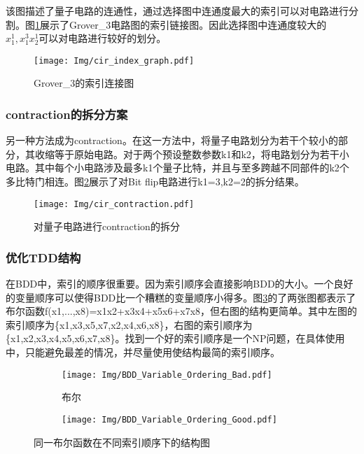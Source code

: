 该图描述了量子电路的连通性，通过选择图中连通度最大的索引可以对电路进行分割。图\ref{fig:addition}展示了Grover\_3电路图的索引链接图。因此选择图中连通度较大的$x_1^1,x_1^3x_2^1$可以对电路进行较好的划分。
 
\begin{figure}[!htbp]
	\centering
	\texttt{[image: Img/cir\_index\_graph.pdf]}
	\caption{Grover\_3的索引连接图}
	\label{fig:addition}
\end{figure} 
\subsubsection{contraction的拆分方案}
另一种方法成为contraction。在这一方法中，将量子电路划分为若干个较小的部分，其收缩等于原始电路。对于两个预设整数参数k1和k2，将电路划分为若干小电路。其中每个小电路涉及最多k1个量子比特，并且与至多跨越不同部件的k2个多比特门相连。图\ref{fig:contraction}展示了对Bit flip电路进行k1=3,k2=2的拆分结果。
\begin{figure}[!htbp]
	\centering
	\texttt{[image: Img/cir\_contraction.pdf]}
	\caption{对量子电路进行contraction的拆分}
	\label{fig:contraction}
\end{figure} 
\subsubsection{优化TDD结构}

在BDD中，索引的顺序很重要。因为索引顺序会直接影响BDD的大小。一个良好的变量顺序可以使得BDD比一个糟糕的变量顺序小得多。图\ref{fig:bdd-compare}的了两张图都表示了布尔函数ƒ(x1,...,x8)=x1x2+x3x4+x5x6+x7x8，但右图的结构更简单。其中左图的索引顺序为\{x1,x3,x5,x7,x2,x4,x6,x8\}，右图的索引顺序为\{x1,x2,x3,x4,x5,x6,x7,x8\}。找到一个好的索引顺序是一个NP问题，在具体使用中，只能避免最差的情况，并尽量使用使结构最简的索引顺序。

\begin{figure}[!htbp]
	\centering
	\begin{subfigure}[b]{.4\textwidth}
        \centering
        \texttt{[image: Img/BDD\_Variable\_Ordering\_Bad.pdf]}
		\caption{布尔\citep{bdd_wiki}}
	\end{subfigure}
	\begin{subfigure}[b]{.4\textwidth}
        \centering
        \texttt{[image: Img/BDD\_Variable\_Ordering\_Good.pdf]}
	\end{subfigure}
	\caption{同一布尔函数在不同索引顺序下的结构图}
	\label{fig:bdd-compare}
\end{figure}

